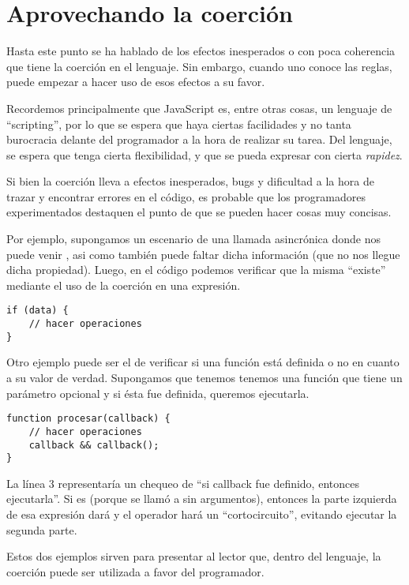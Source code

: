 \section{Aprovechando la coerción}
\label{sec:aprovechando}

Hasta este punto se ha hablado de los efectos inesperados o con poca coherencia que tiene la coerción en el lenguaje. Sin embargo, cuando uno conoce las reglas, puede empezar a hacer uso de esos efectos a su favor.

Recordemos principalmente que JavaScript es, entre otras cosas, un lenguaje de "`scripting"', por lo que se espera que haya ciertas facilidades y no tanta burocracia delante del programador a la hora de realizar su tarea. Del lenguaje, se espera que tenga cierta flexibilidad, y que se pueda expresar con cierta \textit{rapidez}.

Si bien la coerción lleva a efectos inesperados, bugs y dificultad a la hora de trazar y encontrar errores en el código, es probable que los programadores experimentados destaquen el punto de que se pueden hacer cosas muy concisas.

Por ejemplo, supongamos un escenario de una llamada asincrónica donde nos puede venir , asi como también puede faltar dicha información (que no nos llegue dicha propiedad). Luego, en el código podemos verificar que la misma "`existe"' mediante el uso de la coerción en una expresión.

\begin{lstlisting}
if (data) {
	// hacer operaciones
}
\end{lstlisting}

Otro ejemplo puede ser el de verificar si una función está definida o no en cuanto a su valor de verdad. Supongamos que tenemos tenemos una función que tiene un parámetro opcional  y si ésta fue definida, queremos ejecutarla.

\begin{lstlisting}
function procesar(callback) {
	// hacer operaciones
	callback && callback();
}
\end{lstlisting}

La línea 3 representaría un chequeo de "`si callback fue definido, entonces ejecutarla"'. Si  es  (porque se llamó a  sin argumentos), entonces la parte izquierda de esa expresión dará  y el operador \code{\&\&} hará un "`cortocircuito"', evitando ejecutar la segunda parte.

Estos dos ejemplos sirven para presentar al lector que, dentro del lenguaje, la coerción puede ser utilizada a favor del programador.